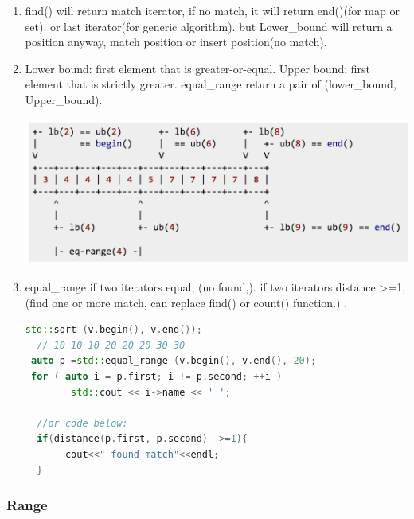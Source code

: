 \documentclass[a4paper,12pt,twoside]{book}
\begin{document}
\begin{itemize}
\begin{enumerate}
\item  find() will return match iterator, if no match, it will return end()(for map or set). or last iterator(for generic algorithm). but Lower\_bound  will return a position anyway, match position or insert position(no match).

\item Lower bound: first element that is greater-or-equal. Upper bound: first element that is strictly greater. equal\_range return a pair of (lower\_bound, Upper\_bound).

\includegraphics[scale=0.66]{pics/lowerupper.png}

\item equal\_range  if two iterators equal, (no found,). if two iterators distance >=1, (find one or more match, can replace find() or count() function.) .
\begin{lstlisting}[frame=single, language=c++]
  std::sort (v.begin(), v.end());
  // 10 10 10 20 20 20 30 30
 auto p =std::equal_range (v.begin(), v.end(), 20);
 for ( auto i = p.first; i != p.second; ++i )
        std::cout << i->name << ' ';

  //or code below:
  if(distance(p.first, p.second)  >=1){
       cout<<" found match"<<endl;
  }
\end{lstlisting}

\end{enumerate}
\end{itemize}


\subsubsection{Range}
\end{document}

